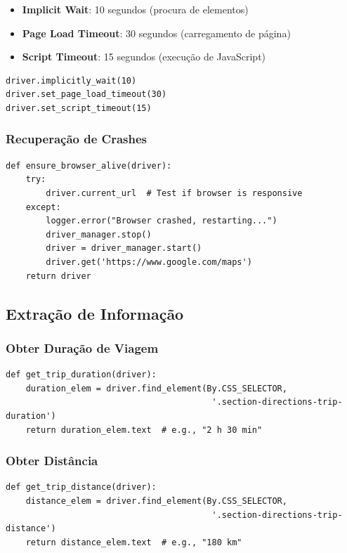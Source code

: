 \begin{itemize}
    \item \textbf{Implicit Wait}: 10 segundos (procura de elementos)
    \item \textbf{Page Load Timeout}: 30 segundos (carregamento de página)
    \item \textbf{Script Timeout}: 15 segundos (execução de JavaScript)
\end{itemize}

\begin{verbatim}
driver.implicitly_wait(10)
driver.set_page_load_timeout(30)
driver.set_script_timeout(15)
\end{verbatim}

\subsubsection{Recuperação de Crashes}

\begin{verbatim}
def ensure_browser_alive(driver):
    try:
        driver.current_url  # Test if browser is responsive
    except:
        logger.error("Browser crashed, restarting...")
        driver_manager.stop()
        driver = driver_manager.start()
        driver.get('https://www.google.com/maps')
    return driver
\end{verbatim}

\subsection{Extração de Informação}

\subsubsection{Obter Duração de Viagem}

\begin{verbatim}
def get_trip_duration(driver):
    duration_elem = driver.find_element(By.CSS_SELECTOR,
                                         '.section-directions-trip-duration')
    return duration_elem.text  # e.g., "2 h 30 min"
\end{verbatim}

\subsubsection{Obter Distância}

\begin{verbatim}
def get_trip_distance(driver):
    distance_elem = driver.find_element(By.CSS_SELECTOR,
                                         '.section-directions-trip-distance')
    return distance_elem.text  # e.g., "180 km"
\end{verbatim}


